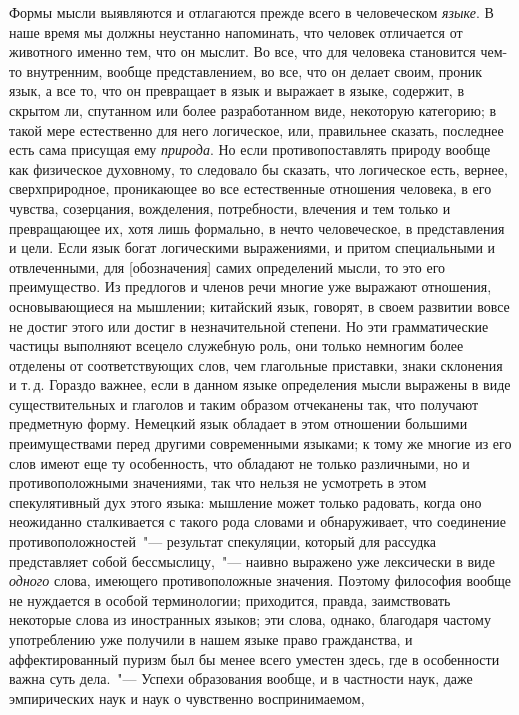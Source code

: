 Формы мысли выявляются и отлагаются прежде всего
в человеческом \emph{языке}. В наше время мы должны неустанно
напоминать, что человек отличается от животного
именно тем, что он мыслит. Во все, что для человека
становится чем-то внутренним, вообще представлением, во
все, что он делает своим, проник язык, а все то, что он
превращает в язык и выражает в языке, содержит, в скрытом
ли, спутанном или более разработанном виде, некоторую
категорию; в такой мере естественно для него логическое,
или, правильнее сказать, последнее есть сама
присущая ему \emph{природа}. Но если противопоставлять природу
вообще как физическое духовному, то следовало бы
сказать, что логическое есть, вернее, сверхприродное, проникающее
во все естественные отношения человека, в его
чувства, созерцания, вожделения, потребности, влечения
и тем только и превращающее их, хотя лишь формально,
в нечто человеческое, в представления и цели. Если язык
богат логическими выражениями, и притом специальными
и отвлеченными, для [обозначения] самих определений
мысли, то это его преимущество. Из предлогов и членов
речи многие уже выражают отношения, основывающиеся
на мышлении; китайский язык, говорят, в своем развитии
вовсе не достиг этого или достиг в незначительной степени.
Но эти грамматические частицы выполняют всецело
служебную роль, они только немногим более отделены от
соответствующих слов, чем глагольные приставки, знаки
склонения и т.\,д. Гораздо важнее, если в данном языке
определения мысли выражены в виде существительных и
глаголов и таким образом отчеканены так, что получают
предметную форму. Немецкий язык обладает в этом отношении
большими преимуществами перед другими современными
языками; к тому же многие из его слов имеют
еще ту особенность, что обладают не только различными,
но и противоположными значениями, так что нельзя не
усмотреть в этом спекулятивный дух этого языка: мышление
может только радовать, когда оно неожиданно
сталкивается с такого рода словами и обнаруживает, что
соединение противоположностей~"--- результат спекуляции,
который для рассудка представляет собой бессмыслицу,~"---
наивно выражено уже лексически в виде \emph{одного} слова,
имеющего противоположные значения. Поэтому философия
вообще не нуждается в особой терминологии; приходится,
правда, заимствовать некоторые слова из иностранных
языков; эти слова, однако, благодаря частому
употреблению уже получили в нашем языке право гражданства,
и аффектированный пуризм был бы менее всего
уместен здесь, где в особенности важна суть дела.~"---
Успехи образования вообще, и в частности наук, даже
эмпирических наук и наук о чувственно воспринимаемом,
